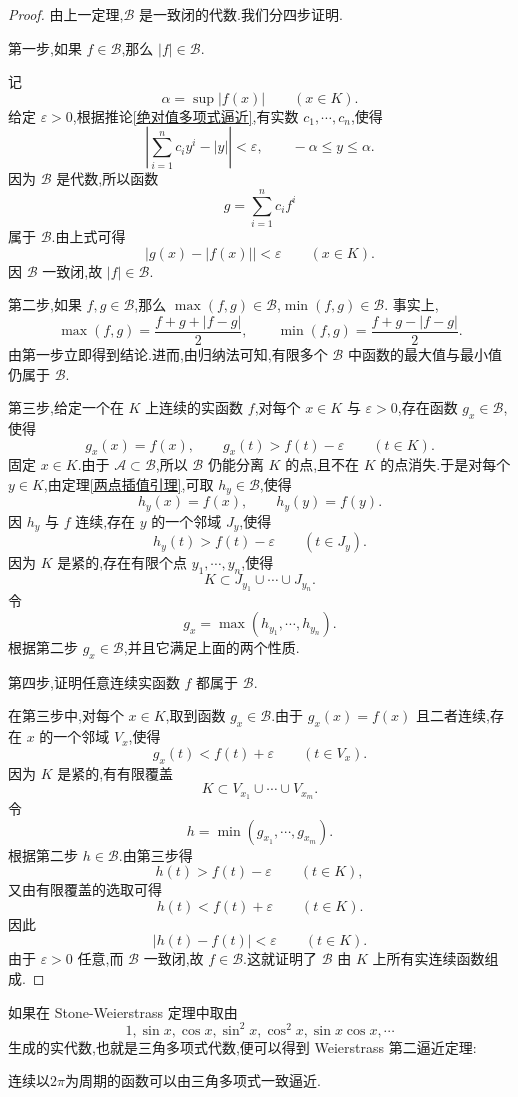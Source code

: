 \begin{proof}
	由上一定理,$\mathscr{B}$ 是一致闭的代数.我们分四步证明.
	
	第一步,如果 $f\in\mathscr{B}$,那么 $|f|\in\mathscr{B}$.
	
	记
	\[
	\alpha=\sup |f(x)|\qquad (x\in K).
	\]
	给定 $\varepsilon>0$,根据推论\ref{绝对值多项式逼近},有实数 $c_1,\cdots,c_n$,使得
	\[
	\left|\sum_{i=1}^{n}c_i y^i-|y|\right|<\varepsilon,
	\qquad -\alpha\leqslant y\leqslant \alpha.
	\]
	因为 $\mathscr{B}$ 是代数,所以函数
	\[
	g=\sum_{i=1}^{n}c_i f^i
	\]
	属于 $\mathscr{B}$.由上式可得
	\[
	|g(x)-|f(x)||<\varepsilon\qquad (x\in K).
	\]
	因 $\mathscr{B}$ 一致闭,故 $|f|\in\mathscr{B}$.
	
	第二步,如果 $f,g\in\mathscr{B}$,那么 $\max(f,g)\in\mathscr{B}$,$\min(f,g)\in\mathscr{B}$.
	事实上,
	\[
	\max(f,g)=\frac{f+g+|f-g|}{2},
	\qquad
	\min(f,g)=\frac{f+g-|f-g|}{2}.
	\]
	由第一步立即得到结论.进而,由归纳法可知,有限多个 $\mathscr{B}$ 中函数的最大值与最小值仍属于 $\mathscr{B}$.
	
	第三步,给定一个在 $K$ 上连续的实函数 $f$,对每个 $x\in K$ 与 $\varepsilon>0$,存在函数 $g_x\in\mathscr{B}$,使得
	\[
	g_x(x)=f(x),
	\qquad
	g_x(t)>f(t)-\varepsilon\qquad (t\in K).
	\]
	固定 $x\in K$.由于 $\mathscr{A}\subset\mathscr{B}$,所以 $\mathscr{B}$ 仍能分离 $K$ 的点,且不在 $K$ 的点消失.于是对每个 $y\in K$,由定理\ref{两点插值引理},可取 $h_y\in\mathscr{B}$,使得
	\[
	h_y(x)=f(x),
	\qquad
	h_y(y)=f(y).
	\]
	因 $h_y$ 与 $f$ 连续,存在 $y$ 的一个邻域 $J_y$,使得
	\[
	h_y(t)>f(t)-\varepsilon\qquad (t\in J_y).
	\]
	因为 $K$ 是紧的,存在有限个点 $y_1,\cdots,y_n$,使得
	\[
	K\subset J_{y_1}\cup\cdots\cup J_{y_n}.
	\]
	令
	\[
	g_x=\max(h_{y_1},\cdots,h_{y_n}).
	\]
	根据第二步 $g_x\in\mathscr{B}$,并且它满足上面的两个性质.
	
	第四步,证明任意连续实函数 $f$ 都属于 $\mathscr{B}$.
	
	在第三步中,对每个 $x\in K$,取到函数 $g_x\in\mathscr{B}$.由于 $g_x(x)=f(x)$ 且二者连续,存在 $x$ 的一个邻域 $V_x$,使得
	\[
	g_x(t)<f(t)+\varepsilon\qquad (t\in V_x).
	\]
	因为 $K$ 是紧的,有有限覆盖
	\[
	K\subset V_{x_1}\cup\cdots\cup V_{x_m}.
	\]
	令
	\[
	h=\min(g_{x_1},\cdots,g_{x_m}).
	\]
	根据第二步 $h\in\mathscr{B}$.由第三步得
	\[
	h(t)>f(t)-\varepsilon\qquad (t\in K),
	\]
	又由有限覆盖的选取可得
	\[
	h(t)<f(t)+\varepsilon\qquad (t\in K).
	\]
	因此
	\[
	|h(t)-f(t)|<\varepsilon\qquad (t\in K).
	\]
	由于 $\varepsilon>0$ 任意,而 $\mathscr{B}$ 一致闭,故 $f\in\mathscr{B}$.这就证明了 $\mathscr{B}$ 由 $K$ 上所有实连续函数组成.
\end{proof}


	如果在 Stone-Weierstrass 定理中取由
	\[
	1,\sin x,\cos x,\sin^2x,\cos^2x,\sin x\cos x,\cdots
	\]
	生成的实代数,也就是三角多项式代数,便可以得到 Weierstrass 第二逼近定理:
	\begin{theorem}
		连续以$2\pi$为周期的函数可以由三角多项式一致逼近.
	\end{theorem}
